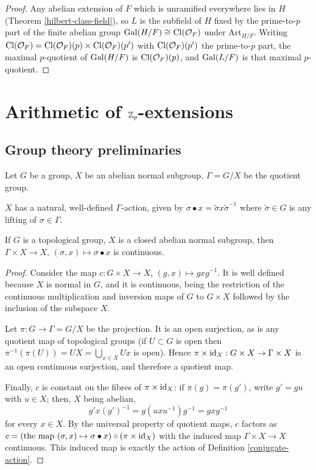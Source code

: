 \begin{proof}
Any abelian extension of $F$ which is unramified everywhere lies in $H$
(Theorem \ref{hilbert-class-field}), so $L$ is the subfield of $H$ fixed by the
prime-to-$p$ part of the finite abelian group
${\mathrm{Gal}}(H/F)\cong{\mathrm{Cl}}({\mathcal {O}}_F)$ under $\mathrm{Art}_{H/F}$.
Writing ${\mathrm{Cl}}({\mathcal {O}}_F)={\mathrm{Cl}}({\mathcal {O}}_F)(p)\times{\mathrm{Cl}}({\mathcal {O}}_F)(p')$ with ${\mathrm{Cl}}({\mathcal {O}}_F)(p')$ the
prime-to-$p$ part, the maximal $p$-quotient of ${\mathrm{Gal}}(H/F)$ is
${\mathrm{Cl}}({\mathcal {O}}_F)(p)$, and ${\mathrm{Gal}}(L/F)$ is that maximal $p$-quotient.
\end{proof}

\section{Arithmetic of ${\mathbb {Z}}_p$-extensions}

\subsection{Group theory preliminaries}

Let $G$ be a group, $X$ be an abelian normal subgroup,
$\Gamma=G/X$ be the quotient group.

\begin{definition}
\label{conjugate-action}
\leanok
$X$ has a natural, well-defined $\Gamma$-action,
given by $\sigma\bullet x
=\widetilde\sigma x\widetilde\sigma^{-1}$
where $\widetilde\sigma\in G$ is any lifting of $\sigma\in\Gamma$.
\end{definition}

\begin{lem}
\label{conjugate-action-cont}
\leanok
If $G$ is a topological group, $X$ is a closed abelian normal subgroup,
then $\Gamma\times X\to X$, $(\sigma,x)\mapsto\sigma\bullet x$
is continuous.
\end{lem}

\begin{proof}
\leanok
Consider the map $c:G\times X\to X$, $(g,x)\mapsto gxg^{-1}$.
It is well defined because $X$ is normal in $G$, and it is continuous, being the
restriction of the continuous multiplication and inversion maps of $G$ to
$G\times X$ followed by the inclusion of the subspace $X$.

Let $\pi:G\to\Gamma=G/X$ be the projection.
It is an open surjection, as is any quotient map of topological groups
(if $U\subset G$ is open then $\pi^{-1}(\pi(U))=UX=\bigcup_{x\in X}Ux$ is open).
Hence $\pi\times{\mathrm{id}}_X:G\times X\to\Gamma\times X$ is an open continuous
surjection, and therefore a quotient map.

Finally, $c$ is constant on the fibres of $\pi\times{\mathrm{id}}_X$: if $\pi(g)=\pi(g')$,
write $g'=gu$ with $u\in X$; then, $X$ being abelian,
$$g'x(g')^{-1}=g(uxu^{-1})g^{-1}=gxg^{-1}$$
for every $x\in X$.
By the universal property of quotient maps, $c$ factors as
$c=(\text{the map }(\sigma,x)\mapsto\sigma\bullet x)\circ(\pi\times{\mathrm{id}}_X)$
with the induced map $\Gamma\times X\to X$ continuous.
This induced map is exactly the action of Definition \ref{conjugate-action}.
\end{proof}

